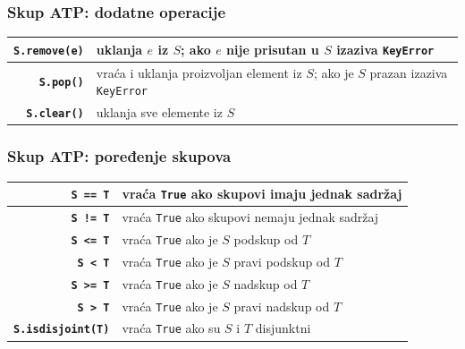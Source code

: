 \documentclass[compress,aspectratio=169]{beamer}
\begin{document}
\begin{frame}[fragile]
  \frametitle{Skup ATP: dodatne operacije}
  \begin{center}
    \begin{tabular}{rp{11cm}}
      \textbf{\texttt{S.remove(e)}} & uklanja $e$ iz $S$; ako $e$ nije prisutan u $S$ izaziva \texttt{KeyError}\\ \hline
      \textbf{\texttt{S.pop()}} & vraća i uklanja proizvoljan element iz $S$; ako je $S$ prazan izaziva \texttt{KeyError}\\ \hline
      \textbf{\texttt{S.clear()}} & uklanja sve elemente iz $S$ \\
    \end{tabular}
  \end{center}
\end{frame}

\begin{frame}[fragile]
  \frametitle{Skup ATP: poređenje skupova}
  \begin{center}
    \begin{tabular}{rp{10cm}}
      \textbf{\texttt{S == T}} & vraća \texttt{True} ako skupovi imaju jednak sadržaj \\ \hline
      \textbf{\texttt{S != T}} & vraća \texttt{True} ako skupovi nemaju jednak sadržaj \\ \hline
      \textbf{\texttt{S <= T}} & vraća \texttt{True} ako je $S$ podskup od $T$ \\ \hline
      \textbf{\texttt{S < T}} & vraća \texttt{True} ako je $S$ pravi podskup od $T$ \\ \hline
      \textbf{\texttt{S >= T}} & vraća \texttt{True} ako je $S$ nadskup od $T$ \\ \hline
      \textbf{\texttt{S > T}} & vraća \texttt{True} ako je $S$ pravi nadskup od $T$ \\ \hline
      \textbf{\texttt{S.isdisjoint(T)}} & vraća \texttt{True} ako su $S$ i $T$ disjunktni \\
    \end{tabular}
  \end{center}
\end{frame}
\end{document}
